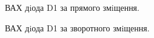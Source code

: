 \documentclass[14pt,a4paper]{scrartcl}
\begin{document}
\begin{figure}[h]
\caption{ВАХ дiода D1 за прямого змiщення.}
\label{ris:image04}
\end{figure}


\begin{figure}[h]
\caption{ВАХ дiода D1 за зворотного змiщення.}
\label{ris:image4}
\end{figure}
\end{document}
